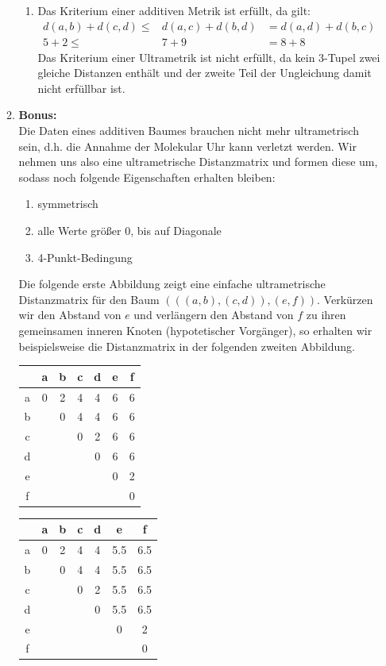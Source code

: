 \documentclass{homework}
\begin{document}
\begin{enumerate}
\begin{enumerate}
\begin{enumerate}
\item Das Kriterium einer additiven Metrik ist erfüllt, da gilt:
\begin{eqnarray*}
d(a,b) + d(c,d) \leq & d(a,c) + d(b,d) & = d(a,d) + d(b,c)\\
5 + 2 \leq & 7 + 9 & = 8 + 8
\end{eqnarray*}
Das Kriterium einer Ultrametrik ist nicht erfüllt, da kein 3-Tupel zwei gleiche
Distanzen enthält und der zweite Teil der Ungleichung damit nicht erfüllbar ist.

\end{enumerate}
\item \textbf{Bonus:}\\
Die Daten eines additiven Baumes brauchen nicht mehr ultrametrisch sein, d.h.
die Annahme der Molekular Uhr kann verletzt werden. Wir nehmen uns also eine
ultrametrische Distanzmatrix und formen diese um, sodass noch folgende
Eigenschaften erhalten bleiben:
\begin{enumerate}
	\item symmetrisch
	\item alle Werte größer 0, bis auf Diagonale
	\item 4-Punkt-Bedingung
\end{enumerate}

Die folgende erste Abbildung zeigt eine einfache ultrametrische Distanzmatrix
für den Baum $(((a,b),(c,d)),(e,f))$. Verkürzen wir den Abstand von $e$ und
verlängern den Abstand von $f$ zu ihren gemeinsamen inneren Knoten
(hypotetischer Vorgänger), so erhalten wir beispielsweise die Distanzmatrix in
der folgenden zweiten Abbildung.

\begin{multicols}{2}
\begin{tabular}{c|cccccc}
 & a & b & c & d & e & f \\\hline
a & 0 & 2 & 4 & 4 & 6 & 6 \\ 
b &  & 0 & 4 & 4 & 6 & 6 \\ 
c &  &  & 0 & 2 & 6 & 6 \\ 
d &  &  &  & 0 & 6 & 6 \\ 
e &  &  &  &  & 0 & 2 \\ 
f &  &  &  &  &  & 0
\end{tabular}

\begin{tabular}{c|cccccc}
 & a & b & c & d & e & f \\\hline
a & 0 & 2 & 4 & 4 & 5.5 & 6.5 \\ 
b &  & 0 & 4 & 4 & 5.5 & 6.5 \\ 
c &  &  & 0 & 2 & 5.5 & 6.5 \\ 
d &  &  &  & 0 & 5.5 & 6.5 \\ 
e &  &  &  &  & 0 & 2 \\ 
f &  &  &  &  &  & 0
\end{tabular}
\end{multicols}


\end{enumerate}
\end{enumerate}
\end{document}
